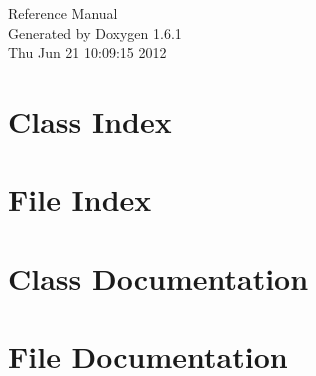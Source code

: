 \documentclass[a4paper]{book}
\begin{document}
\hypersetup{pageanchor=false}
\begin{titlepage}
\vspace*{7cm}
\begin{center}
{\Large Reference Manual}\\
\vspace*{1cm}
{\large Generated by Doxygen 1.6.1}\\
\vspace*{0.5cm}
{\small Thu Jun 21 10:09:15 2012}\\
\end{center}
\end{titlepage}
\clearemptydoublepage
{}
\tableofcontents
\clearemptydoublepage
{}
\hypersetup{pageanchor=true}
\chapter{Class Index}

\chapter{File Index}

\chapter{Class Documentation}







\chapter{File Documentation}




















\printindex
\end{document}
